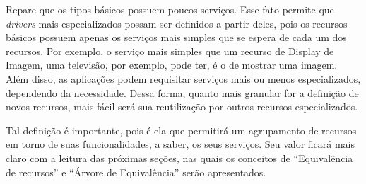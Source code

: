 Repare que os tipos básicos possuem poucos serviços. Esse fato permite que \emph{drivers} mais especializados possam ser definidos a partir deles, pois os recursos básicos possuem apenas os serviços mais simples que se espera de cada um dos recursos. Por exemplo, o serviço mais simples que um recurso de Display de Imagem, uma televisão, por exemplo, pode ter, é o de mostrar uma imagem. Além disso, as aplicações podem requisitar serviços mais ou menos especializados, dependendo da necessidade. Dessa forma, quanto mais granular for a definição de novos recursos, mais fácil será sua reutilização por outros recursos especializados.

Tal definição é importante, pois é ela que permitirá um agrupamento de recursos em torno de suas funcionalidades, a saber, os seus serviços. Seu valor ficará mais claro com a leitura das próximas seções, nas quais os conceitos de ``Equivalência de recursos'' e ``Árvore de Equivalência'' serão apresentados.

\begin{comment}
Suponha que um usuário, por meio de uma aplicação de seu celular, deseja utilizar os serviços providos de um recurso de imagem. Considere ainda, que existam três instâncias disponíveis deste recurso no \emph{smart space}. Para garantir a equivalência dos recursos devemos garantir que eles possuam os mesmos serviços, e para isso, devemos garantir que os serviços possuam a mesma interface, ou seja, os mesmos tipos e número de parâmetros. Suponha que para o usuário que deseja o recurso simples de imagem seja indiferente a quantidade de \emph{megapixels} da imagem. Para o usuário basta apenas o provimento do serviço que retorne algum dado ou altere o estado de alguma aplicação. Dessa forma, devemos garantir que qualquer uma das três instâncias possam prover esse serviço. Uma câmera com \emph{flash}, por exemplo, para este cenário, seria equivalente a um recurso de câmera sem \emph{flash}.
\end{comment}





